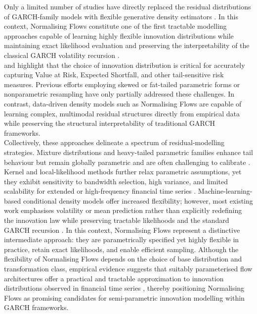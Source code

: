 \documentclass[oneside,12pt]{CUEDthesisPSnPDF}
\newcommand{\textcite}{\citet}
\newcommand{\parencite}{\citep}
\begin{document}
Only a limited number of studies have directly replaced the residual distributions of GARCH-family models with flexible generative density estimators \parencite{seitz2022garchnf,wu2022deepgarch}. In this context, Normalising Flows constitute one of the first tractable modelling approaches capable of learning highly flexible innovation distributions while maintaining exact likelihood evaluation and preserving the interpretability of the classical GARCH volatility recursion \parencite{rezende2015variational,papamakarios2021normalizing}.\\


\textcite{bauwens2006multivariate} and \textcite{hansen1994autoregressive} highlight that the choice of innovation distribution is critical for accurately capturing Value at Risk, Expected Shortfall, and other tail-sensitive risk measures. Previous efforts employing skewed or fat-tailed parametric forms \parencite{bollerslev1987conditionally,hansen1994autoregressive} or nonparametric resampling \parencite{mcneil2000estimation} have only partially addressed these challenges. In contrast, data-driven density models such as Normalising Flows are capable of learning complex, multimodal residual structures directly from empirical data while preserving the structural interpretability of traditional GARCH frameworks.\\

Collectively, these approaches delineate a spectrum of residual-modelling strategies. Mixture distributions and heavy-tailed parametric families enhance tail behaviour but remain globally parametric and are often challenging to calibrate \parencite{bauwens2006multivariate}. Kernel and local-likelihood methods further relax parametric assumptions, yet they exhibit sensitivity to bandwidth selection, high variance, and limited scalability for extended or high-frequency financial time series \parencite{silverman1986density}. Machine-learning-based conditional density models offer increased flexibility; however, most existing work emphasises volatility or mean prediction rather than explicitly redefining the innovation law while preserving tractable likelihoods and the standard GARCH recursion \parencite{bao2017deep}. In this context, Normalising Flows represent a distinctive intermediate approach: they are parametrically specified yet highly flexible in practice, retain exact likelihoods, and enable efficient sampling. Although the flexibility of Normalising Flows depends on the choice of base distribution and transformation class, empirical evidence suggests that suitably parameterised flow architectures offer a practical and tractable approximation to innovation distributions observed in financial time series \parencite{papamakarios2021normalizing}, thereby positioning Normalising Flows as promising candidates for semi-parametric innovation modelling within GARCH frameworks.\\
\end{document}
